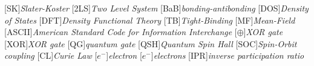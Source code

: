 \begin{acronym}[TDMA]
  [SK]{\emph{Slater-Koster}}
  [2LS]{\emph{Two Level System}}
  [BaB]{\emph{bonding-antibonding}}
  [DOS]{\emph{Density of States}}
  [DFT]{\emph{Density Functional Theory}}
  [TB]{\emph{Tight-Binding}}
  [MF]{\emph{Mean-Field}}
  [ASCII]{\emph{American Standard Code for Information Interchange}}
  [$\oplus$]{\emph{XOR gate}}
  [XOR]{\emph{XOR gate}}
  [QG]{\emph{quantum gate}}
  [QSH]{\emph{Quantum Spin Hall}}
  [SOC]{\emph{Spin-Orbit coupling}}
  [CL]{\emph{Curie Law}}
  [$e^{-}$]{\emph{electron}}
  [$e^{-}$]{\emph{electrons}}
  [IPR]{\emph{inverse participation ratio}}
\end{acronym}
